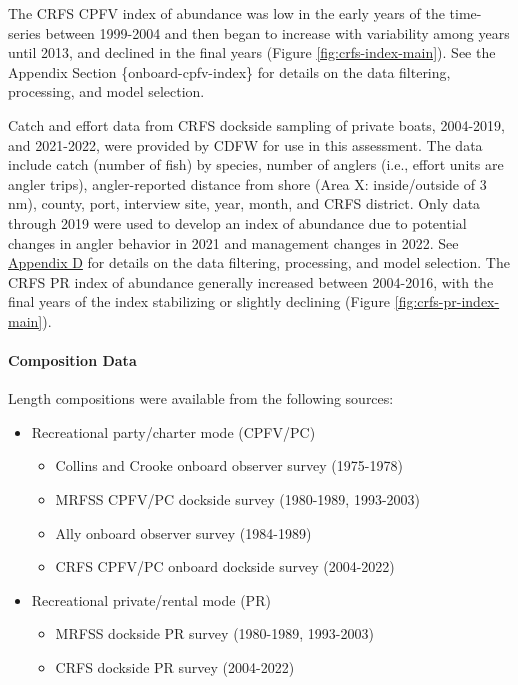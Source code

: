 \documentclass[11pt,
  english,
  letterpaper,
]{article}
\providecommand{\tightlist}{%
  \setlength{\itemsep}{0pt}\setlength{\parskip}{0pt}}
\providecommand{\tightlist}{%
  \setlength{\itemsep}{0pt}\setlength{\parskip}{0pt}}
\begin{document}
The CRFS CPFV index of abundance was low in the early years of the time-series between 1999-2004 and then began to increase with variability among years until 2013, and declined in the final years (Figure \ref{fig:crfs-index-main}). See the Appendix Section \{onboard-cpfv-index\} for details on the data filtering, processing, and model selection.

Catch and effort data from CRFS dockside sampling of private boats, 2004-2019, and 2021-2022, were provided by CDFW for use in this assessment. The data include catch (number of fish) by species, number of anglers (i.e., effort units are angler trips), angler-reported distance from shore (Area X: inside/outside of 3 nm), county, port, interview site, year, month, and CRFS district. Only data through 2019 were used to develop an index of abundance due to potential changes in angler behavior in 2021 and management changes in 2022. See \protect\hyperlink{crfs-pr-index}{Appendix D} for details on the data filtering, processing, and model selection. The CRFS PR index of abundance generally increased between 2004-2016, with the final years of the index stabilizing or slightly declining (Figure \ref{fig:crfs-pr-index-main}).

\hypertarget{composition-data-1}{%
\paragraph{Composition Data}\label{composition-data-1}}

\hfill\break

Length compositions were available from the following sources:

\begin{itemize}
\item
  Recreational party/charter mode (CPFV/PC)

  \begin{itemize}
  \tightlist
  \item
    Collins and Crooke onboard observer survey (1975-1978)
  \item
    MRFSS CPFV/PC dockside survey (1980-1989, 1993-2003)
  \item
    Ally onboard observer survey (1984-1989)
  \item
    CRFS CPFV/PC onboard dockside survey (2004-2022)
  \end{itemize}
\item
  Recreational private/rental mode (PR)

  \begin{itemize}
  \tightlist
  \item
    MRFSS dockside PR survey (1980-1989, 1993-2003)
  \item
    CRFS dockside PR survey (2004-2022)
  \end{itemize}
\end{itemize}
\end{document}
